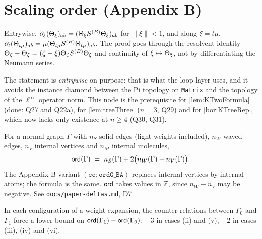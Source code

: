 \chapter{Scaling order (Appendix B)}

\begin{lemma}[The derivative of the propagator, $\mathtt{(2.51)}$ of the $d=1$ paper]\label{lem:Theta-deriv}
  \leanok
  Entrywise, $\partial_\xi(\Theta_\xi)_{ab}=(\Theta_\xi S^{(B)}\Theta_\xi)_{ab}$ for $\|\xi\|<1$, and
  along $\xi=t\mu$, $\partial_t(\Theta_{t\mu})_{ab}=\mu(\Theta_{t\mu}S^{(B)}\Theta_{t\mu})_{ab}$.
  The proof goes through the resolvent identity
  $\Theta_\zeta-\Theta_\xi=(\zeta-\xi)\Theta_\zeta S^{(B)}\Theta_\xi$ and continuity of $\xi\mapsto\Theta_\xi$,
  not by differentiating the Neumann series.

  The statement is \emph{entrywise} on purpose: that is what the loop layer uses, and it
  avoids the instance diamond between the Pi topology on \texttt{Matrix} and the topology
  of the $\ell^\infty$ operator norm.  This node is the prerequisite for \ref{lem:KTwoFormula} (done: Q27 and Q22a), for
  \ref{lem:treeThree} ($n=3$, Q29) and for \ref{bor:KTreeRep}, which now lacks only
  existence at $n\ge4$ (Q30, Q31).
\end{lemma}

\begin{definition}\label{def:ord}
  \leanok
  For a normal graph $\Gamma$ with $n_S$ solid edges (light-weights included), $n_W$ waved
  edges, $n_V$ internal vertices and $n_M$ internal molecules,
  \[ \mathsf{ord}(\Gamma) \;=\; n_S(\Gamma) + 2\bigl(n_W(\Gamma)-n_V(\Gamma)\bigr). \]
  The Appendix B variant $\mathtt{(eq{:}ordG\_BA)}$ replaces internal vertices by internal
  atoms; the formula is the same.  $\mathsf{ord}$ takes values in $\mathbb Z$, since $n_W-n_V$ may
  be negative.  See \texttt{docs/paper-deltas.md}, D7.
\end{definition}

\begin{lemma}\label{lem:ord-cases}
  \leanok
  In each configuration of a weight expansion, the counter relations between $\Gamma_0$ and
  $\Gamma_1$ force a lower bound on $\mathsf{ord}(\Gamma_1)-\mathsf{ord}(\Gamma_0)$: $+3$ in cases (ii) and
  (v), $+2$ in cases (iii), (iv) and (vi).
\end{lemma}

